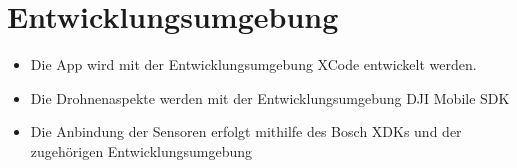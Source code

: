 


\chapter{Entwicklungsumgebung}\label{cha:Entwicklungsumgebung}

\begin{itemize}
	\item Die App wird mit der Entwicklungsumgebung XCode entwickelt werden.
	\item Die Drohnenaspekte werden mit der Entwicklungsumgebung DJI Mobile SDK
	\item Die Anbindung der Sensoren erfolgt mithilfe des Bosch XDKs und der zugehörigen Entwicklungsumgebung
			
\end{itemize} 